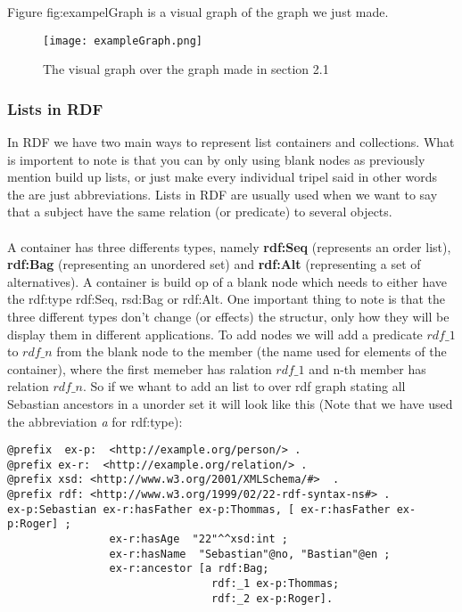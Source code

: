 Figure \refname{fig:exampelGraph} is a visual graph of the graph we just made.
\begin{figure}
    \centering
    \texttt{[image: exampleGraph.png]}
    \caption{The visual graph over the graph made in section 2.1}
    \label{fig:exampelGraph}
\end{figure}

\subsubsection{Lists in RDF}
In RDF we have two main ways to represent list containers and collections. What is importent to
note is that you can by only using blank nodes as previously mention build up lists, or just
make every individual tripel said in other words the are just abbreviations. Lists in RDF are usually
used when we want to say that a subject have the same relation (or predicate) to several objects.
\\ \\ 
A container has three differents types, namely \textbf{rdf:Seq} (represents an order list), 
\textbf{rdf:Bag} (representing an unordered set) and \textbf{rdf:Alt} (representing a set of alternatives).
A container is build op of a blank node which needs to either have the rdf:type
rdf:Seq, rsd:Bag or rdf:Alt. One important thing to note is that the three different types
don't change (or effects) the structur, only how they will be display them in different applications.
To add nodes we will add a predicate $rdf\_1$ to $rdf\_n$ from the blank node to the member (the name used for 
elements of the container), where the first memeber has ralation $rdf\_1$ and n-th member has relation $rdf\_n$.
So if we whant to add an list to over rdf graph stating all Sebastian ancestors in a unorder set 
it will look like this (Note that we have used the abbreviation \textit{a} for rdf:type):
\begin{lstlisting}[frame=single, language=turtle]
@prefix  ex-p:  <http://example.org/person/> . 
@prefix ex-r:  <http://example.org/relation/> . 
@prefix xsd: <http://www.w3.org/2001/XMLSchema/#>  . 
@prefix rdf: <http://www.w3.org/1999/02/22-rdf-syntax-ns#> .
ex-p:Sebastian ex-r:hasFather ex-p:Thommas, [ ex-r:hasFather ex-p:Roger] ; 
                ex-r:hasAge  "22"^^xsd:int ; 
                ex-r:hasName  "Sebastian"@no, "Bastian"@en ;
                ex-r:ancestor [a rdf:Bag; 
                                rdf:_1 ex-p:Thommas; 
                                rdf:_2 ex-p:Roger].
\end{lstlisting}
